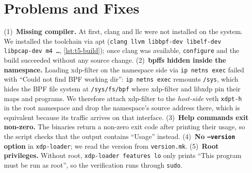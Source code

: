 \section{Problems and Fixes}\label{sec:t5-problems}
(1)~\textbf{Missing compiler.} At first, clang and llc were not installed on the system. We installed the toolchain via apt (\texttt{clang llvm libbpf-dev libelf-dev libpcap-dev m4 \dots}, \cref{lst:t5-build}); once clang was available, \texttt{configure} and the build succeeded without any source change. (2)~\textbf{bpffs hidden inside the namespace.} Loading xdp-filter on the namespace side via \texttt{ip netns exec} failed with \enquote{Could not find BPF working dir}: \texttt{ip netns exec} remounts \texttt{/sys}, which hides the BPF file system at \texttt{/sys/fs/bpf} where xdp-filter and libxdp pin their maps and programs. We therefore attach xdp-filter to the \emph{host-side} veth \texttt{xdpt-h} in the root namespace and drop the namespace's source address there, which is equivalent because its traffic arrives on that interface. (3)~\textbf{Help commands exit non-zero.} The binaries return a non-zero exit code after printing their usage, so the script checks that the output contains \enquote{Usage} instead. (4)~\textbf{No \texttt{--version} option} in \texttt{xdp-loader}; we read the version from \texttt{version.mk}. (5)~\textbf{Root privileges.} Without root, \texttt{xdp-loader features lo} only prints \enquote{This program must be run as root}, so the verification runs through \texttt{sudo}.
